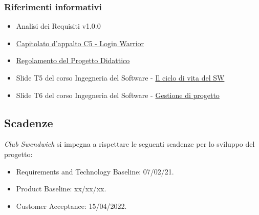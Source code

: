 \subsubsection{Riferimenti informativi}
\begin{itemize}
    \item Analisi dei Requisiti v1.0.0
    \item \href{https://www.math.unipd.it/~tullio/IS-1/2021/Progetto/C5.pdf}{Capitolato d'appalto C5 - Login Warrior}
    \item \href{https://www.math.unipd.it/~tullio/IS-1/2021/Dispense/PD2.pdf}{Regolamento del Progetto Didattico}
    \item Slide T5 del corso Ingegneria del Software - \href{https://www.math.unipd.it/~tullio/IS-1/2021/Dispense/T05.pdf}{Il ciclo di vita del SW}
    \item Slide T6 del corso Ingegneria del Software - \href{https://www.math.unipd.it/~tullio/IS-1/2021/Dispense/T06.pdf}{Gestione di progetto}
\end{itemize}

\subsection{Scadenze}
\textit{Club Swendwich} si impegna a rispettare le seguenti scadenze per lo sviluppo del progetto:
\begin{itemize}
    \item Requirements and Technology Baseline: 07/02/21.
    \item Product Baseline: xx/xx/xx.
    \item Customer Acceptance: 15/04/2022.
\end{itemize}